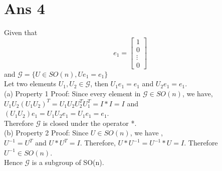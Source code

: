 \documentclass[10pt]{article}
\begin{document}
\section*{Ans 4}
\begin{flushleft}
Given that $$
e_{1} = 
\begin{bmatrix} 
1 \\
0 \\
\vdots \\
0 
\end{bmatrix} 
$$
and $\mathcal{G} = \{U \in SO(n), U e_{1} = e_{1}\}$\\
\vspace{0.5em}
Let two elements $U_{1}, U_{2} \in \mathcal{G}$, then $U_{1} e_{1} = e_{1}$ and $U_{2} e_{1} = e_{1}$.\\
\vspace{0.5em}
(a) Property 1 Proof: Since every element in $\mathcal{G} \in SO(n)$, we have, \\
\vspace{0.5em}
$U_{1} U_{2} (U_{1} U_{2})^{T} = U_{1} U_{2} U_{2}^{T} U_{1}^{T} = I*I = I$ and \\
\vspace{0.5em}
$(U_{1} U_{2}) e_{1} = U_{1} U_{2} e_{1} = U_{1} e_{1} = e_{1}$. \\
\vspace{0.5em}
Therefore $\mathcal{G}$ is closed under the operator *.\\
\vspace{0.5em}
(b) Property 2 Proof: Since $U \in SO(n)$, we have ,\\
\vspace{0.5em}
$U^{-1} = U^{T}$ and $U*U^{T}=I$. Therefore, $U*U^{-1} = U^{-1}*U = I$. Therefore $U^{-1} \in SO(n)$.\\
\vspace{0.5em}
Hence $\mathcal{G}$ is a subgroup of SO(n).
\end{flushleft}
\end{document}
